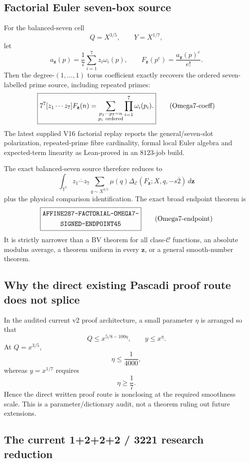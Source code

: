 \documentclass[11pt]{article}
\theoremstyle{definition}
\newcommand{\1}{\mathbf 1}
\begin{document}
\subsection{Factorial Euler seven-box source}

For the balanced-seven cell
\[
Q=X^{3/5},\qquad Y=X^{1/7},
\]
let
\[
a_{\mathbf z}(p)=\frac17\sum_{i=1}^7z_i\omega_i(p),
\qquad
\boxed{
F_{\mathbf z}(p^e)=\frac{a_{\mathbf z}(p)^e}{e!}.
}
\tag{Omega7-factorial}
\]
Then the degree-$(1,\ldots,1)$ torus coefficient exactly recovers the ordered seven-labelled
prime source, including repeated primes:
\[
\boxed{
7^7[z_1\cdots z_7]F_{\mathbf z}(n)
=
\sum_{\substack{p_1\cdots p_7=n\\p_i\ {\rm ordered}}}
\prod_{i=1}^7\omega_i(p_i).
}
\tag{Omega7-coeff}
\]
The latest supplied V16 factorial replay reports the general/seven-slot polarization,
repeated-prime fibre cardinality, formal local Euler algebra and expected-term linearity as
Lean-proved in an $8123$-job build.

The exact balanced-seven source therefore reduces to
\[
\int_{\mathbb T^7}\overline{z_1\cdots z_7}
\sum_{q\sim X^{3/5}}\mu(q)
\Delta_{\mathcal E}(F_{\mathbf z};X,q,-s\overline2)\,d\mathbf z
\]
plus the physical comparison identification.  The exact broad endpoint theorem is
\[
\boxed{\begin{gathered}\text{\ttfamily AFFINE287-FACTORIAL-OMEGA7-}\\\text{\ttfamily SIGNED-ENDPOINT45}\end{gathered}}
\tag{Omega7-endpoint}
\]
It is strictly narrower than a BV theorem for all class-$\mathcal C$ functions, an
absolute modulus average, a theorem uniform in every $\mathbf z$, or a general
smooth-number theorem.

\subsection{Why the direct existing Pascadi proof route does not splice}

In the audited current v2 proof architecture, a small parameter $\eta$ is arranged so that
\[
Q\le x^{5/8-100\eta},
\qquad
y\le x^\eta.
\]
At $Q=x^{3/5}$,
\[
\eta\le\frac1{4000},
\]
whereas $y=x^{1/7}$ requires
\[
\eta\ge\frac17.
\]
Hence the direct written proof route is nonclosing at the required smoothness scale.  This is
a parameter/dictionary audit, not a theorem ruling out future extensions.

\subsection{The current 1+2+2+2 / 3221 research reduction}
\end{document}
